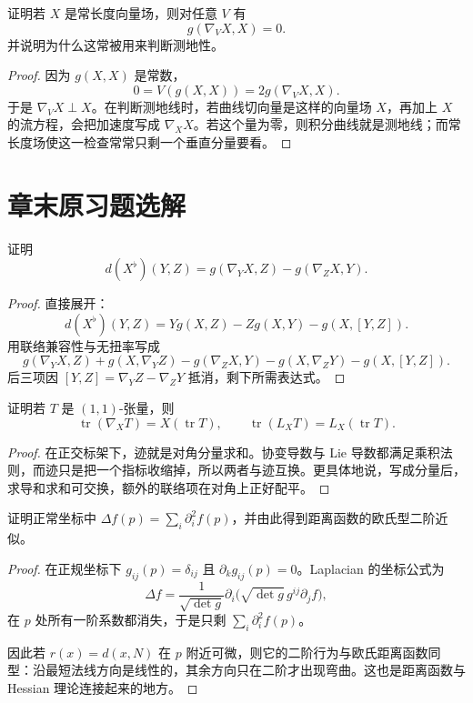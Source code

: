 \documentclass[11pt,a4paper,openany]{ctexbook}
\numberwithin{equation}{chapter}
\begin{document}
\begin{problem}
证明若 \(X\) 是常长度向量场，则对任意 \(V\) 有
\[
g(\nabla_VX,X)=0.
\]
并说明为什么这常被用来判断测地性。
\end{problem}
\begin{proof}
因为 \(g(X,X)\) 是常数，
\[
0=V(g(X,X))=2g(\nabla_VX,X).
\]
于是 \(\nabla_VX\perp X\)。在判断测地线时，若曲线切向量是这样的向量场 \(X\)，再加上 \(X\) 的流方程，会把加速度写成 \(\nabla_XX\)。若这个量为零，则积分曲线就是测地线；而常长度场使这一检查常常只剩一个垂直分量要看。
\end{proof}

\section{章末原习题选解}

\begin{problem}
证明
\[
d(X^\flat)(Y,Z)=g(\nabla_YX,Z)-g(\nabla_ZX,Y).
\]
\end{problem}
\begin{proof}
直接展开：
\[
d(X^\flat)(Y,Z)=Yg(X,Z)-Zg(X,Y)-g(X,[Y,Z]).
\]
用联络兼容性与无扭率写成
\[
g(\nabla_YX,Z)+g(X,\nabla_YZ)-g(\nabla_ZX,Y)-g(X,\nabla_ZY)-g(X,[Y,Z]).
\]
后三项因 \([Y,Z]=\nabla_YZ-\nabla_ZY\) 抵消，剩下所需表达式。
\end{proof}

\begin{problem}
证明若 \(T\) 是 \((1,1)\)-张量，则
\[
\operatorname{tr}(\nabla_XT)=X(\operatorname{tr}T),\qquad
\operatorname{tr}(L_XT)=L_X(\operatorname{tr}T).
\]
\end{problem}
\begin{proof}
在正交标架下，迹就是对角分量求和。协变导数与 Lie 导数都满足乘积法则，而迹只是把一个指标收缩掉，所以两者与迹互换。更具体地说，写成分量后，求导和求和可交换，额外的联络项在对角上正好配平。
\end{proof}

\begin{problem}
证明正常坐标中 \(\Delta f(p)=\sum_i\partial_i^2f(p)\)，并由此得到距离函数的欧氏型二阶近似。
\end{problem}
\begin{proof}
在正规坐标下 \(g_{ij}(p)=\delta_{ij}\) 且 \(\partial_k g_{ij}(p)=0\)。Laplacian 的坐标公式为
\[
\Delta f=\frac1{\sqrt{\det g}}\partial_i\bigl(\sqrt{\det g}\,g^{ij}\partial_j f\bigr),
\]
在 \(p\) 处所有一阶系数都消失，于是只剩 \(\sum_i\partial_i^2f(p)\)。

因此若 \(r(x)=d(x,N)\) 在 \(p\) 附近可微，则它的二阶行为与欧氏距离函数同型：沿最短法线方向是线性的，其余方向只在二阶才出现弯曲。这也是距离函数与 Hessian 理论连接起来的地方。
\end{proof}
\end{document}
